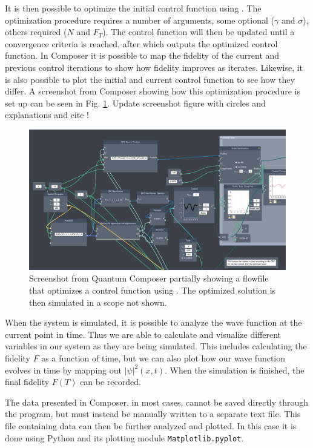 \documentclass[a4paper, twocolumn]{revtex4-1}
\begin{document}
It is then possible to optimize the initial control function using . The optimization procedure requires a number of arguments, some optional ($\gamma$ and $\sigma$), others required ($N$ and $F_T$). The control function will then be updated until a convergence criteria is reached, after which  outputs the optimized control function. In Composer it is possible to map the fidelity of the current and previous control iterations to show how fidelity improves as  iterates. Likewise, it is also possible to plot the initial and current control function to see how they differ. A screenshot from Composer showing how this optimization procedure is set up can be seen in Fig. \ref{fig:composerScreens}.
Update screenshot figure with circles and explanations and cite \cite{ahmed2020quantum}!
\begin{figure}
	\centering
	\includegraphics[width=\textwidth]{graphics/composerScreens/composerWide.png}
	\caption{Screenshot from Quantum Composer partially showing a flowfile that optimizes a control function using . The optimized solution is then simulated in a scope not shown.}
	\label{fig:composerScreens}
\end{figure}

When the system is simulated, it is possible to analyze the wave function at the current point in time. Thus we are able to calculate and visualize different variables in our system as they are being simulated. This includes calculating the fidelity $F$ as a function of time, but we can also plot how our wave function evolves in time by mapping out $|\psi|^2(x,t)$. When the simulation is finished, the final fidelity $F(T)$ can be recorded.


The data presented in Composer, in most cases, cannot be saved directly through the program, but must instead be manually written to a separate text file. This file containing data can then be further analyzed and plotted. In this case it is done using Python and its plotting module \texttt{Matplotlib.pyplot}.
\end{document}
